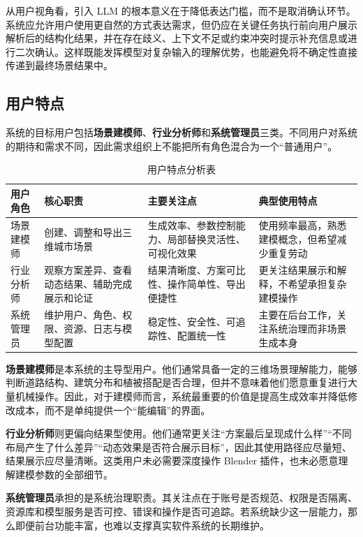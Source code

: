 \documentclass[UTF8,a4paper,10pt]{ctexart}
\begin{document}
从用户视角看，引入 LLM 的根本意义在于降低表达门槛，而不是取消确认环节。系统应允许用户使用更自然的方式表达需求，但仍应在关键任务执行前向用户展示解析后的结构化结果，并在存在歧义、上下文不足或约束冲突时提示补充信息或进行二次确认。这样既能发挥模型对复杂输入的理解优势，也能避免将不确定性直接传递到最终场景结果中。

\subsection{用户特点}
系统的目标用户包括\textbf{场景建模师}、\textbf{行业分析师}和\textbf{系统管理员}三类。不同用户对系统的期待和需求不同，因此需求组织上不能把所有角色混合为一个“普通用户”。


\begin{table}[H]
\centering
\caption{用户特点分析表}


\begin{tabularx}{\textwidth}{p{2.5cm} p{3.1cm} Y Y}
\toprule
{}  %
用户角色 & 核心职责 & 主要关注点 & 典型使用特点 \\
\midrule
场景建模师 & 创建、调整和导出三维城市场景 & 生成效率、参数控制能力、局部替换灵活性、可视化效果 & 使用频率最高，熟悉建模概念，但希望减少重复劳动 \\
行业分析师 & 观察方案差异、查看动态结果、辅助完成展示和论证 & 结果清晰度、方案可比性、操作简单性、导出便捷性 & 更关注结果展示和解释，不希望承担复杂建模操作 \\
系统管理员 & 维护用户、角色、权限、资源、日志与模型配置 & 稳定性、安全性、可追踪性、配置统一性 & 主要在后台工作，关注系统治理而非场景生成本身 \\
\bottomrule
\end{tabularx}
\end{table}

\textbf{场景建模师}是本系统的主导型用户。他们通常具备一定的三维场景理解能力，能够判断道路结构、建筑分布和植被搭配是否合理，但并不意味着他们愿意重复进行大量机械操作。因此，对于建模师而言，系统最重要的价值是提高生成效率并降低修改成本，而不是单纯提供一个“能编辑”的界面。

\textbf{行业分析师}则更偏向结果型使用。他们通常更关注“方案最后呈现成什么样”“不同布局产生了什么差异”“动态效果是否符合展示目标”，因此其使用路径应尽量短、结果展示应尽量清晰。这类用户未必需要深度操作 Blender 插件，也未必愿意理解建模参数的全部细节。

\textbf{系统管理员}承担的是系统治理职责。其关注点在于账号是否规范、权限是否隔离、资源库和模型服务是否可控、错误和操作是否可追踪。若系统缺少这一层能力，那么即便前台功能丰富，也难以支撑真实软件系统的长期维护。
\end{document}
